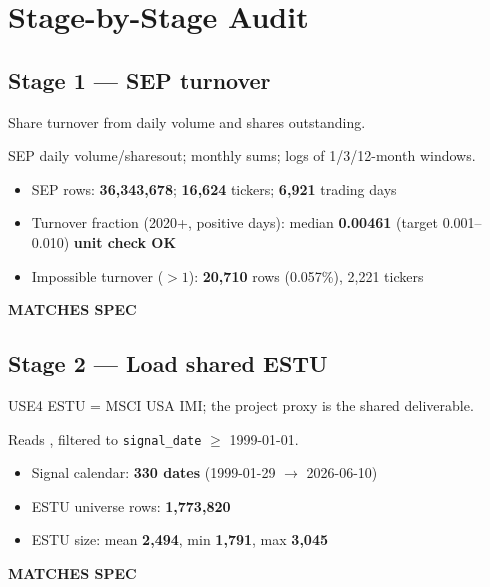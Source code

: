 \documentclass[11pt,a4paper]{article}
\newcommand{\PASS}[1]{\textcolor{pass}{\textbf{#1}}}
\begin{document}
\section{Stage-by-Stage Audit}

\subsection{Stage 1 --- SEP turnover}

\begin{description}[style=nextline]
  \item[PDF SPEC] Share turnover from daily volume and shares outstanding.
  \item[Implementation] SEP daily volume/sharesout; monthly sums; logs of 1/3/12-month windows.
  \item[Observed]\phantom{x}
    \begin{itemize}[nosep, topsep=-\parskip]
      \item SEP rows: \textbf{36{,}343{,}678}; \textbf{16{,}624} tickers; \textbf{6{,}921} trading days
      \item Turnover fraction (2020+, positive days): median \textbf{0.00461} (target 0.001--0.010) \PASS{unit check OK}
      \item Impossible turnover ($>1$): \textbf{20{,}710} rows (0.057\%), 2{,}221 tickers
    \end{itemize}
  \item[Status] \PASS{MATCHES SPEC}
\end{description}

\subsection{Stage 2 --- Load shared ESTU}

\begin{description}[style=nextline]
  \item[PDF SPEC] USE4 ESTU = MSCI USA IMI; the project proxy is the shared  deliverable.
  \item[Implementation] Reads , filtered to \texttt{signal\_date} $\geq$ 1999-01-01.
  \item[Observed]\phantom{x}
    \begin{itemize}[nosep, topsep=-\parskip]
      \item Signal calendar: \textbf{330 dates} (1999-01-29 $\to$ 2026-06-10)
      \item ESTU universe rows: \textbf{1{,}773{,}820}
      \item ESTU size: mean \textbf{2{,}494}, min \textbf{1{,}791}, max \textbf{3{,}045}
    \end{itemize}
  \item[Status] \PASS{MATCHES SPEC}
\end{description}
\end{document}
